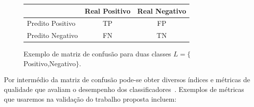\begin{figure}[!htp]
    \centering
\begin{tabular}{l|c|c}
\cline{2-3}
\multicolumn{1}{c|}{}                    & 
\cellcolor[HTML]{CBCEFB}Real Positivo & \cellcolor[HTML]{CBCEFB}Real Negativo \\ \hline
\cellcolor[HTML]{CBCEFB}Predito Positivo & \cellcolor[HTML]{9AFF99}TP            & \cellcolor[HTML]{FD6864}FP            \\ \hline
\cellcolor[HTML]{CBCEFB}Predito Negativo & \cellcolor[HTML]{FD6864}FN            & \cellcolor[HTML]{9AFF99}TN            \\ \hline \hline
\end{tabular}
        \caption[Exemplo de matriz de confusão para duas classes]{Exemplo de matriz de confusão para duas classes $L = \{$Positivo,Negativo$\}$.}
    \label{fig:matriz_conf}
\end{figure}

Por intermédio da matriz de confusão pode-se obter diversos índices e métricas de qualidade que avaliam o desempenho dos classificadores~\cite{Congalton2008,Powers2011}.
Exemplos de métricas que usaremos na validação do trabalho proposta incluem:


